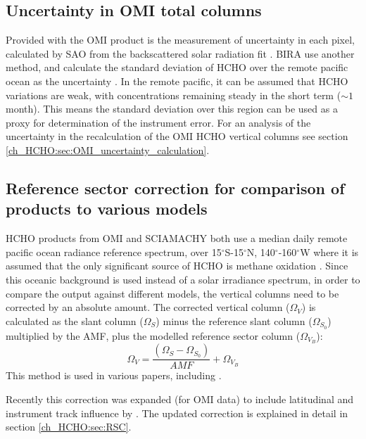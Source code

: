   \subsection{Uncertainty in OMI total columns}
  \label{ch_HCHO:sec:OMIuncertainty}
    Provided with the OMI product is the measurement of uncertainty in each pixel, calculated by SAO from the backscattered solar radiation fit \citep{Abad2015,Abad2016}.
    BIRA use another method, and calculate the standard deviation of HCHO over the remote pacific ocean as the uncertainty \citep{DeSmedt2012, DeSmedt2015}.
    In the remote pacific, it can be assumed that HCHO variations are weak, with concentrations remaining steady in the short term ($\sim 1$ month).
    This means the standard deviation over this region can be used as a proxy for determination of the instrument error.
    For an analysis of the uncertainty in the recalculation of the OMI HCHO vertical columns see section \ref{ch_HCHO:sec:OMI_uncertainty_calculation}.
    
  \subsection{Reference sector correction for comparison of products to various models}
    HCHO products from OMI and SCIAMACHY both use a median daily remote pacific ocean radiance reference spectrum, over 15$^{\circ}$S-15$^{\circ}$N, 140$^{\circ}$-160$^{\circ}$W where it is assumed that the only significant source of HCHO is methane oxidation \citep{DeSmedt2008,Barkley2013,Kurosu2014}.
    Since this oceanic background is used instead of a solar irradiance spectrum, in order to compare the output against different models, the vertical columns need to be corrected by an absolute amount.
    The corrected vertical column ($\Omega_V$) is calculated as the slant column ($\Omega_S$) minus the reference slant column ($\Omega_{S_0}$) multiplied by the AMF, plus the modelled reference sector column ($\Omega_{V_B}$):
    \begin{equation*}
      \Omega_V = \frac{ \left( \Omega_S - \Omega_{S_0} \right) }{ AMF } + \Omega_{V_B}
    \end{equation*}
    This method is used in various papers, including \citet{DeSmedt2008, DeSmedt2012, DeSmedt2015, Barkley2013, Bauwens2016}.
    
    Recently this correction was expanded (for OMI data) to include latitudinal and instrument track influence by \citet{Abad2015}.
    The updated correction is explained in detail in section \ref{ch_HCHO:sec:RSC}.
    
